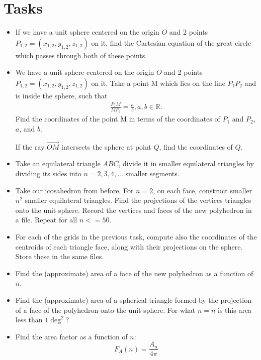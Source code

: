 \documentclass[author-year, prd, amsmath, amssymb, longbibliography, floatfix, reprint, superscriptaddress, a4]{revtex4-1}
\begin{document}
\section{Tasks}
\begin{itemize}
\item If we have a unit sphere centered on the origin \(O\) and 2 points \(P_{1,2} = (x_{1,2}, y_{1,2}, z_{1,2})\) on it, find the
Cartesian equation of the great circle which passes through both of these points.

\item We have a unit sphere centered on the origin \(O\) and 2 points \(P_{1,2} = (x_{1,2}, y_{1,2}, z_{1,2})\) on it. Take a point {M}
which lies on the line \(P_{1} P_{2}\) and is inside the sphere, such that
\begin{align}
    \frac{P_{1} M}{M P_{2}} = \frac{a}{b}, a, b \in \mathbb{R}.
\end{align}
Find the coordinates of the point {M} in terms of the coordinates of \(P_{1}\) and \(P_{2}\), \(a\), and \(b\).

If the ray \(\vec{OM}\) intersects the sphere at point \(Q\), find the coordinates of \(Q\).

\item Take an equilateral triangle \(ABC\), divide it in smaller equilateral triangles by dividing its sides into \(n = 2, 3, 4, ...\) smaller segments.

\item Take our icosahedron from before. For \(n = 2\), on each face, construct smaller \(n^{2}\) smaller equilateral triangles. Find the projections of the vertices triangles onto the unit sphere. Record the vertices and faces of the new polyhedron in a file. Repeat for all \(n <= 50\).

\item For each of the grids in the previous task, compute also the coordinates of the centroids of each triangle face, along with their projections on the sphere. Store these in the same files.

\item Find the (approximate) area of a face of the new polyhedron as a function of \(n\).

\item Find the (approximate) area of a spherical triangle formed by the projection of a face of the polyhedron onto the unit sphere. For what \(n = \tilde{n}\) is this area less than \(1 \deg^{2}\)?

\item Find the area factor as a function of \(n\):
$$F_{A}(n) = \frac{A_{n}}{4 \pi}$$


\end{itemize}
\end{document}
